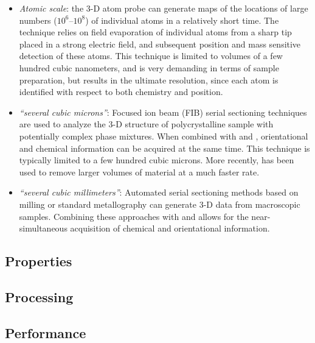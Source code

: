 \begin{itemize}
\item \textit{Atomic scale}:  the  3-D  atom probe \cite{seidman2000a,miller2004a,hono2005a} can generate maps of the locations of large numbers ($10^6$--$10^8$) of individual atoms in a relatively short time. The technique relies on field evaporation of individual atoms from a sharp tip placed in a strong electric field, and subsequent position and mass sensitive detection of these atoms.  This technique is limited to volumes of a few hundred cubic nanometers, and is very demanding in terms of sample preparation, but results in the ultimate resolution, since each atom is identified with respect to both chemistry and position.

\item \textit{``several cubic microns''}:  Focused ion beam (FIB) serial sectioning techniques \cite{dunn1999a,uchic2006a} are used to analyze the 3-D  structure of polycrystalline sample with potentially complex phase mixtures.  When combined with  and , orientational and chemical information can be acquired at the same time.  This technique is typically limited to a few hundred cubic microns.  More recently,  \cite{Echlin2015} has been used to remove larger volumes of material at a much faster rate.

\item \textit{``several cubic millimeters''}: Automated serial sectioning methods based on milling \cite{alkemper2001a} or standard metallography \cite{spowart2003a} can generate  3-D  data from macroscopic samples. Combining these approaches  with  and  allows for the near-simultaneous acquisition of chemical and orientational information.
\end{itemize}

\subsection{Properties}


\subsection{Processing}


\subsection{Performance}


